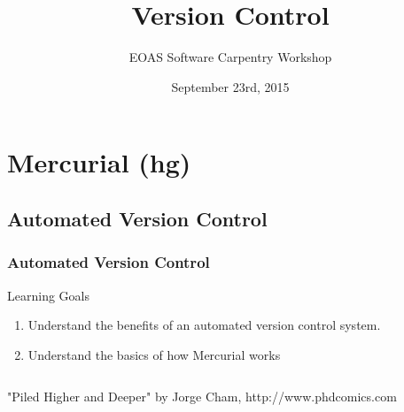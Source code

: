 \documentclass{beamer}
\title[Mercurial]{Version Control}
\subtitle[]{EOAS Software Carpentry Workshop }
\date[Sep 2015]{September 23rd, 2015}
\begin{document}
\section*{Mercurial (hg)}

\begin{frame}[plain]
\titlepage
\end{frame}

\subsection*{Automated Version Control}
\begin{frame}
\frametitle{Automated Version Control}
\begin{block}{Learning Goals}
\begin{enumerate}
\item Understand the benefits of an automated version control system.
\item Understand the basics of how Mercurial works
\end{enumerate}
\end{block}
\end{frame}

\begin{frame}
\begin{columns}
"Piled Higher and Deeper" by Jorge Cham, http://www.phdcomics.com
\end{columns}
\end{frame}
\end{document}
